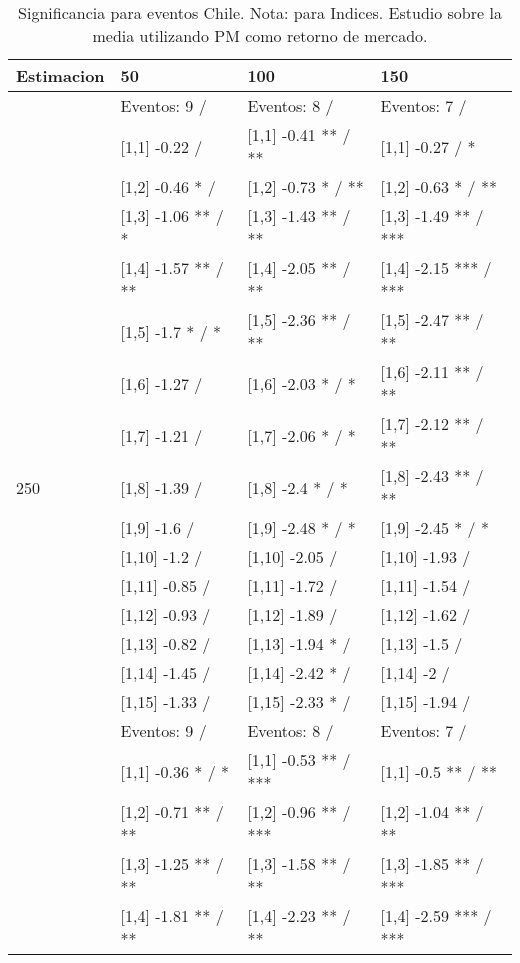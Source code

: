 \begin{table}

\caption{Significancia para eventos Chile. Nota: para Indices. Estudio sobre la media utilizando PM como retorno de mercado.}
\centering
\begin{tabular}[t]{llll}
\toprule
Estimacion & 50 & 100 & 150\\
\midrule
 & Eventos:  9 / & Eventos:  8 / & Eventos:  7 /\\
 & {}[1,1] -0.22  / & {}[1,1] -0.41 ** / ** & {}[1,1] -0.27  / *\\
 & {}[1,2] -0.46 * / & {}[1,2] -0.73 * / ** & {}[1,2] -0.63 * / **\\
 & {}[1,3] -1.06 ** / * & {}[1,3] -1.43 ** / ** & {}[1,3] -1.49 ** / ***\\
 & {}[1,4] -1.57 ** / ** & {}[1,4] -2.05 ** / ** & {}[1,4] -2.15 *** / ***\\
\addlinespace
 & {}[1,5] -1.7 * / * & {}[1,5] -2.36 ** / ** & {}[1,5] -2.47 ** / **\\
 & {}[1,6] -1.27  / & {}[1,6] -2.03 * / * & {}[1,6] -2.11 ** / **\\
 & {}[1,7] -1.21  / & {}[1,7] -2.06 * / * & {}[1,7] -2.12 ** / **\\
250 & {}[1,8] -1.39  / & {}[1,8] -2.4 * / * & {}[1,8] -2.43 ** / **\\
 & {}[1,9] -1.6  / & {}[1,9] -2.48 * / * & {}[1,9] -2.45 * / *\\
\addlinespace
 & {}[1,10] -1.2  / & {}[1,10] -2.05  / & {}[1,10] -1.93  /\\
 & {}[1,11] -0.85  / & {}[1,11] -1.72  / & {}[1,11] -1.54  /\\
 & {}[1,12] -0.93  / & {}[1,12] -1.89  / & {}[1,12] -1.62  /\\
 & {}[1,13] -0.82  / & {}[1,13] -1.94 * / & {}[1,13] -1.5  /\\
 & {}[1,14] -1.45  / & {}[1,14] -2.42 * / & {}[1,14] -2  /\\
\addlinespace
 & {}[1,15] -1.33  / & {}[1,15] -2.33 * / & {}[1,15] -1.94  /\\
 & Eventos:  9 / & Eventos:  8 / & Eventos:  7 /\\
 & {}[1,1] -0.36 * / * & {}[1,1] -0.53 ** / *** & {}[1,1] -0.5 ** / **\\
 & {}[1,2] -0.71 ** / ** & {}[1,2] -0.96 ** / *** & {}[1,2] -1.04 ** / **\\
 & {}[1,3] -1.25 ** / ** & {}[1,3] -1.58 ** / ** & {}[1,3] -1.85 ** / ***\\
\addlinespace
 & {}[1,4] -1.81 ** / ** & {}[1,4] -2.23 ** / ** & {}[1,4] -2.59 *** / ***\\

\end{tabular}
\end{table}
